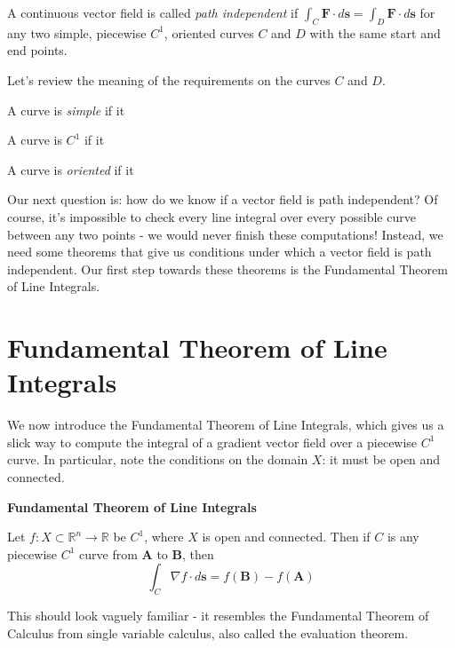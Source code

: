 \documentclass{ximera}
\begin{document}
\begin{definition}
A continuous vector field is called \emph{path independent} if $\int_C \textbf{F}\cdot d\textbf{s}=\int_D \textbf{F}\cdot d\textbf{s}$ for any two simple, piecewise $C^1$, oriented curves $C$ and $D$ with the same start and end points.
\end{definition}

Let's review the meaning of the requirements on the curves $C$ and $D$.

A curve is \emph{simple} if it 

A curve is $C^1$ if it 

A curve is \emph{oriented} if it 

Our next question is: how do we know if a vector field is path independent? Of course, it's impossible to check every line integral over every possible curve between any two points - we would never finish these computations! Instead, we need some theorems that give us conditions under which a vector field is path independent. Our first step towards these theorems is the Fundamental Theorem of Line Integrals.

\section{Fundamental Theorem of Line Integrals}

We now introduce the Fundamental Theorem of Line Integrals, which gives us a slick way to compute the integral of a gradient vector field over a piecewise $C^1$ curve. In particular, note the conditions on the domain $X$: it must be open and connected.

\begin{theorem}
\textbf{Fundamental Theorem of Line Integrals}

Let $f:X\subset \mathbb{R}^n\rightarrow \mathbb{R}$ be $C^1$, where $X$ is open and connected. Then if $C$ is any piecewise $C^1$ curve from $\textbf{A}$ to $\textbf{B}$, then
\[
\int_C\nabla f\cdot d\textbf{s} = f(\textbf{B})-f(\textbf{A})
\]
\end{theorem}

This should look vaguely familiar - it resembles the Fundamental Theorem of Calculus from single variable calculus, also called the evaluation theorem.
\end{document}
